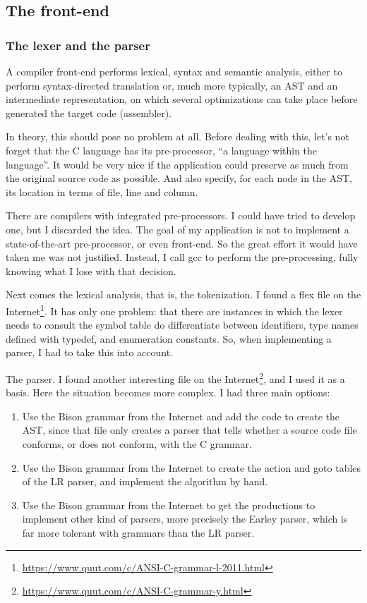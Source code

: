 \documentclass[a4paper,openany]{article}
\begin{document}
\subsection{The front-end}
\subsubsection{The lexer and the parser}
A compiler front-end performs lexical, syntax and sem\-antic analysis, either to perform syntax-directed translation or, much more typically, an AST and an intermediate representation, on which several optimizations can take place before generated the target code (assembler).

In theory, this should pose no problem at all. Before dealing with this, let's not forget that the C language has its pre-processor, ``a language within the language''. It would be very nice if the application could preserve as much from the original source code as possible. And also specify, for each node in the AST, its location in terms of file, line and column.

There are compilers with integrated pre-processors. I could have tried to develop one, but I discarded the idea. The goal of my application is not to implement a state-of-the-art pre-processor, or even front-end. So the great effort it would have taken me was not justified. Instead, I call gcc to perform the pre-processing, fully knowing what I lose with that decision.

Next comes the lexical analysis, that is, the tokenization. I found a flex file on the Internet\footnote{\url{https://www.quut.com/c/ANSI-C-grammar-l-2011.html}}. It has only one problem: that there are instances in which the lexer needs to consult the symbol table do differentiate between identifiers, type names defined with typedef, and enumeration constants. So, when implementing a parser, I had to take this into account.

The parser. I found another interesting file on the Internet\footnote{\url{https://www.quut.com/c/ANSI-C-grammar-y.html}}, and I used it as a basis. Here the situation becomes more complex. I had three main options:

\begin{enumerate}
\item Use the Bison grammar from the Internet and add the code to create the AST, since that file only creates a parser that tells whether a source code file conforms, or does not conform, with the C grammar.

\item Use the Bison grammar from the Internet to create the action and goto tables of the LR parser, and implement the algorithm by hand.

\item Use the Bison grammar from the Internet to get the productions to implement other kind of parsers, more precisely the Earley parser, which is far more tolerant with grammars than the LR parser.
\end{enumerate}
\end{document}
